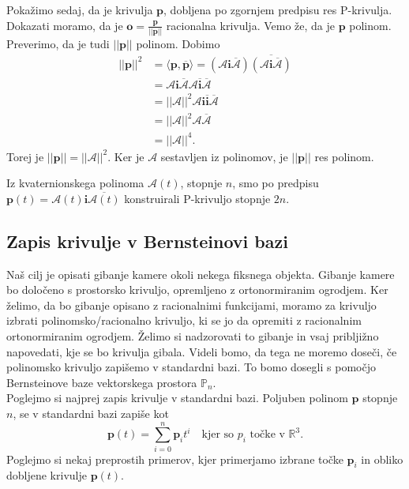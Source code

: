 \documentclass[mat1]{fmfdelo}
\newcommand{\R}{\mathbb R}
\newcommand{\ii}{\boldsymbol i}
\newcommand{\pp}{\boldsymbol p}
\newcommand{\A}{\mathcal A}
\begin{document}
Pokažimo sedaj, da je krivulja $\pp$, dobljena po zgornjem predpisu res P-krivulja. Dokazati moramo, da je $\boldsymbol{o} = \frac{\pp}{||\pp||}$ racionalna krivulja. Vemo že, da je $\pp$ polinom. Preverimo, da je tudi $||\pp||$ polinom. Dobimo
\begin{equation*}
\begin{split}
||\pp||^2 &= \langle \pp,\overline{\pp}\rangle = (\A\ii\overline{\A})\overline{(\A\ii\overline{\A})} \\
&= \A\ii\overline{\A}\A\overline{\ii} \overline{\A} \\
&= ||\A||^2 \A \ii \overline{\ii} \overline{\A} \\
& = ||\A||^2 \A \overline{\A} \\
&=||\A||^4.
\end{split}
\end{equation*}
Torej je $||\pp|| = ||\A||^2$. Ker je $\A$ sestavljen iz polinomov, je $||\pp||$ res polinom.\\

\begin{lema}
	Iz kvaternionskega polinoma $\A(t)$, stopnje $n$, smo po predpisu\\ $\pp(t) = \A(t)\ii\overline{\A(t)}$ konstruirali P-krivuljo stopnje $2n$. 
\end{lema}

\subsection{Zapis krivulje v Bernsteinovi bazi}
Naš cilj je opisati gibanje kamere okoli nekega fiksnega objekta. Gibanje kamere bo določeno s prostorsko krivuljo, opremljeno z ortonormiranim ogrodjem. Ker želimo, da bo gibanje opisano z racionalnimi funkcijami, moramo za krivuljo izbrati polinomsko/racionalno krivuljo, ki se jo da opremiti z racionalnim ortonormiranim ogrodjem. Želimo si nadzorovati to gibanje in vsaj pribljižno napovedati, kje se bo krivulja gibala. Videli bomo, da tega ne moremo doseči, če polinomsko krivuljo zapišemo v standardni bazi. To bomo dosegli s pomočjo Bernsteinove baze vektorskega prostora $\mathbb{P}_n$. \\
Poglejmo si najprej zapis krivulje v standardni bazi. Poljuben polinom $\pp$ stopnje $n$, se v standardni bazi zapiše kot
\begin{equation*}
\pp(t) = \sum_{i=0}^n \pp_i t^i \quad \text{kjer so $p_i$ točke v $\R^3$.}
\end{equation*}
Poglejmo si nekaj preprostih primerov, kjer primerjamo izbrane točke $\pp_i$ in obliko dobljene krivulje $\pp(t)$.
\end{document}
